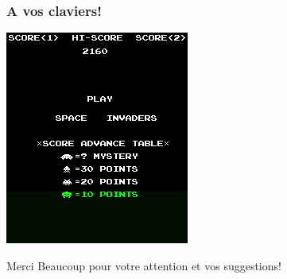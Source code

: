 \documentclass{beamer}
\newcommand{\<}[1]{\`#1}
\begin{document}
\begin{frame}
  \frametitle{A vos claviers!}
  \begin{center}
    \includegraphics[scale=0.4]{intro-movie2}
  \end{center}
  Merci Beaucoup pour votre attention et vos suggestions!
\end{frame}
\end{document}
